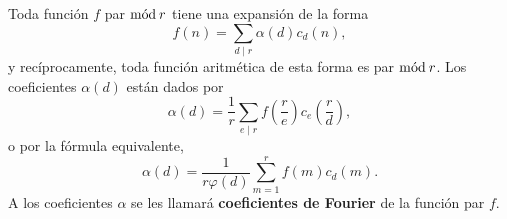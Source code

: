 \begin{theorem}\label{thm:fou1}
Toda función $f$ par $\mathrm{m\acute{o}d\:}r$ tiene una expansión de la forma
\begin{equation}\label{eq:ram3}
    f(n) = \sum_{d \mid r} \alpha(d) c_d(n),
\end{equation}
y recíprocamente, toda función aritmética de esta forma es par $\mathrm{m\acute{o}d\:}r$. Los coeficientes $\alpha(d)$ están dados por
\begin{equation}\label{eq:ram6}
    \alpha(d) = \frac{1}{r} \sum_{e \mid r} f \left( \frac{r}{e} \right) c_e \left( \frac{r}{d} \right),
\end{equation}
o por la fórmula equivalente,
\begin{equation*}
    \alpha(d) = \frac{1}{r \varphi(d)} \sum_{m=1}^{r} f(m) c_d(m).
\end{equation*}
A los coeficientes $\alpha$ se les llamará \textbf{coeficientes de Fourier} de la función par $f$.
\end{theorem}
